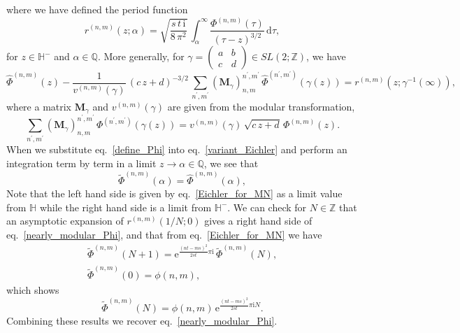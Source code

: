 \documentclass[12pt,reqno]{amsart}
\begin{document}
where we have defined the period function
\begin{equation}
  r^{(n,m)}(z; \alpha )
  =
  \sqrt{\frac{s \, t \, \mathrm{i}}{8 \, \pi^2}}
  \,
  \int_{\alpha}^\infty
  \frac{
    \Phi^{(n,m)}(\tau)
  }{
    (\tau - z)^{3/2}
  } \,
  \mathrm{d} \tau ,
\end{equation}
for $z \in \mathbb{H}^-$ and $\alpha \in \mathbb{Q}$.
More generally, for
$\gamma = 
\begin{pmatrix}
  a & b \\
  c & d
\end{pmatrix}
\in
SL(2; \mathbb{Z})$,
we have
\begin{equation}
  \widehat{\Phi}^{(n,m)}(z)
  -
  \frac{1}{v^{(n,m)}(\gamma)} \, (c \, z+ d)^{-3/2} \,
  \sum_{n^\prime , m^\prime}
  \left(
    \mathbf{M}_\gamma
  \right)_{n,m}^{n^\prime , m^\prime} \,
  \widehat{\Phi}^{(n^\prime , m^\prime)}  ( \gamma(z) )
  =
  r^{(n,m)}(z ; \gamma^{-1}(\infty)) ,
\end{equation}
where  a matrix $\mathbf{M}_\gamma$ and $v^{(n,m)}(\gamma)$ are given from the
modular transformation,
\begin{equation*}
  \sum_{n^\prime , m^\prime}
  \left(
    \mathbf{M}_\gamma
  \right)_{n, m}^{n^\prime ,m^\prime}
  \,
  \Phi^{(n^\prime, m^\prime)}(\gamma(z))
  =
  v^{(n, m)}(\gamma) \,
  \sqrt{c \, z + d} \,
  \Phi^{(n,m)}(z) .
\end{equation*}
When we substitute eq.~\eqref{define_Phi}
into eq.~\eqref{variant_Eichler} and perform an integration term by
term in a limit  $z \to \alpha  \in \mathbb{Q}$,
we see that
\begin{equation*}
  \widetilde{\Phi}^{(n,m)}(\alpha)
  =
  \widehat{\Phi}^{(n,m)}(\alpha) ,
\end{equation*}
Note that the left hand side is given by eq.~\eqref{Eichler_for_MN} as
a limit value from $\mathbb{H}$ while the right hand side is a limit
from $\mathbb{H}^-$.
We can check for $N\in \mathbb{Z}$ that
an asymptotic expansion of $r^{(n,m)}(1/N;0)$  gives a right hand side
of eq.~\eqref{nearly_modular_Phi}, and that from
eq.~\eqref{Eichler_for_MN}
we have
\begin{gather*}
  \widetilde{\Phi}^{(n,m)}(N+1)
  =
  \mathrm{e}^{\frac{(n t - m s)^2}{2 s t} \pi \mathrm{i}} \,
  \widetilde{\Phi}^{(n,m)}(N),
  \\[2mm]
%
  \widetilde{\Phi}^{(n,m)}(0)
  =
  \phi(n,m) ,
\end{gather*}
which shows
\begin{equation*}
  \widetilde{\Phi}^{(n,m)}(N)
  =
  \phi(n,m) \,
  \mathrm{e}^{\frac{(n t - m s)^2}{2 s t} \pi \mathrm{i} N} .
\end{equation*}
Combining these results
we recover eq.~\eqref{nearly_modular_Phi}.
\end{document}

